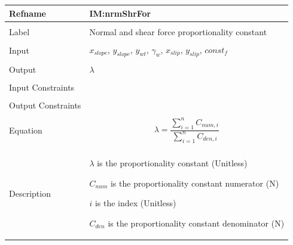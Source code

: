 \documentclass[12pt]{article}
\begin{document}
\noindent \begin{minipage}{\textwidth}
\begin{tabular}{p{} p{}}
\toprule \textbf{Refname} & \textbf{IM:nrmShrFor}
\label{IM:nrmShrFor}
\\ \midrule \\
Label & Normal and shear force proportionality constant
        \\ \midrule \\
        Input & ${x_{slope}}$, ${y_{slope}}$, ${y_{wt}}$, ${γ_{w}}$, ${x_{slip}}$, ${y_{slip}}$, $const_f$
                \\ \midrule \\
                Output & $λ$
                         \\ \midrule \\
                         Input Constraints & \\ \midrule \\
                                             Output Constraints & \\ \midrule \\
                                                                  Equation & \begin{displaymath}
                                                                             λ=\frac{\displaystyle\sum_{i=1}^{n}{{C_{num,i}}}}{\displaystyle\sum_{i=1}^{n}{{C_{den,i}}}}
                                                                             \end{displaymath}
                                                                             \\ \midrule \\
                                                                             Description & \begin{symbDescription}
                                                                                           \item{$λ$ is the proportionality constant (Unitless)}
                                                                                           \item{${C_{num}}$ is the proportionality constant numerator (N)}
                                                                                           \item{$i$ is the index (Unitless)}
                                                                                           \item{${C_{den}}$ is the proportionality constant denominator (N)}

\end{symbDescription}
\end{tabular}
\end{minipage}
\end{document}
